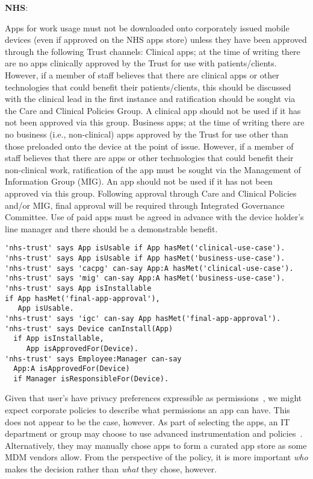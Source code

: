 \documentclass{llncs}
\newenvironment{policyrule}[1]{%
  \begin{mdframed}\footnotesize
      \noindent\textbf{\sffamily #1}:~\itshape%
}{%
  \end{mdframed}
}
\begin{document}
\begin{policyrule}{NHS}
  Apps for work usage must not be downloaded onto corporately issued
  mobile devices (even if approved on the NHS apps store) unless they have
  been approved through the following Trust channels:
% 
  Clinical apps; at the time of writing there are no apps clinically
  approved by the Trust for use with patients/clients. However, if a
  member of staff believes that there are clinical apps or other
  technologies that could benefit their patients/clients, this should be
  discussed with the clinical lead in the first instance and ratification
  should be sought via the Care and Clinical Policies Group. A clinical
  app should not be used if it has not been approved via this group.
% 
  Business apps; at the time of writing there are no business (i.e.,
  non-clinical) apps approved by the Trust for use other than those
  preloaded onto the device at the point of issue. However, if a member of
  staff believes that there are apps or other technologies that could
  benefit their non-clinical work, ratification of the app must be sought
  via the Management of Information Group (MIG). An app should not be used
  if it has not been approved via this group.
%
  Following approval through Care and Clinical Policies and/or MIG, final
  approval will be required through Integrated Governance Committee.
%
  Use of paid apps must be agreed in advance with the device holder's line
  manager and there should be a demonstrable benefit.
  \normalfont
  \begin{lstlisting}
'nhs-trust' says App isUsable if App hasMet('clinical-use-case').
'nhs-trust' says App isUsable if App hasMet('business-use-case').
'nhs-trust' says 'cacpg' can-say App:A hasMet('clinical-use-case').
'nhs-trust' says 'mig' can-say App:A hasMet('business-use-case').
'nhs-trust' says App isInstallable
if App hasMet('final-app-approval'),
   App isUsable.
'nhs-trust' says 'igc' can-say App hasMet('final-app-approval').
'nhs-trust' says Device canInstall(App)
  if App isInstallable,
     App isApprovedFor(Device).
'nhs-trust' says Employee:Manager can-say
  App:A isApprovedFor(Device)
  if Manager isResponsibleFor(Device).
  \end{lstlisting}
\end{policyrule}
Given that user's have privacy preferences expressible as permissions~\cite{lin_modeling_2014}, we might expect corporate policies to describe what permissions an app can have.
This does not appear to be the case, however. 
As part of selecting the apps, an IT department or group may choose to use advanced instrumentation and policies~\cite{armando_enabling_2014}. 
Alternatively, they may manually chose apps to form a curated app store as some \ac{MDM} vendors allow.
From the perspective of the policy, it is more important \emph{who} makes the decision rather than \emph{what} they chose, however.
\end{document}

